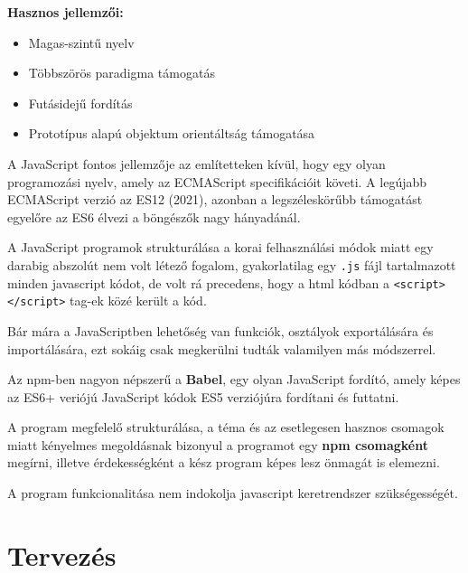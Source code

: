\textbf{Hasznos jellemzői:}
\begin{itemize}
	\item Magas-szintű nyelv
	\item Többszörös paradigma támogatás
	\item Futásidejű fordítás
	\item Prototípus alapú objektum orientáltság támogatása
\end{itemize}
\begin{flushright}
	\cite{javascript}
\end{flushright}

A JavaScript fontos jellemzője az említetteken kívül, hogy egy olyan programozási nyelv, amely az ECMAScript specifikációit követi. A legújabb ECMAScript verzió az ES12 (2021), azonban a legszéleskörűbb támogatást egyelőre az ES6 élvezi a böngészők nagy hányadánál. 

A JavaScript programok strukturálása a korai felhasználási módok miatt egy darabig abszolút nem volt létező fogalom, gyakorlatilag egy \texttt{.js} fájl tartalmazott minden javascript kódot, de volt rá precedens, hogy a html kódban a \texttt{<script></script>} tag-ek közé került a kód.

Bár mára a JavaScriptben lehetőség van funkciók, osztályok exportálására és importálására, ezt sokáig csak megkerülni tudták valamilyen más módszerrel.

Az npm-ben nagyon népszerű a \textbf{Babel}, egy olyan JavaScript fordító, amely képes az ES6+ veriójú JavaScript kódok ES5 verziójúra fordítani és futtatni.

A program megfelelő strukturálása, a téma és az esetlegesen hasznos csomagok miatt kényelmes megoldásnak bizonyul a programot egy \textbf{npm csomagként} megírni, illetve érdekességként a kész program képes lesz önmagát is elemezni.

A program funkcionalitása nem indokolja javascript keretrendszer szükségességét.

\pagebreak

\section{Tervezés}



